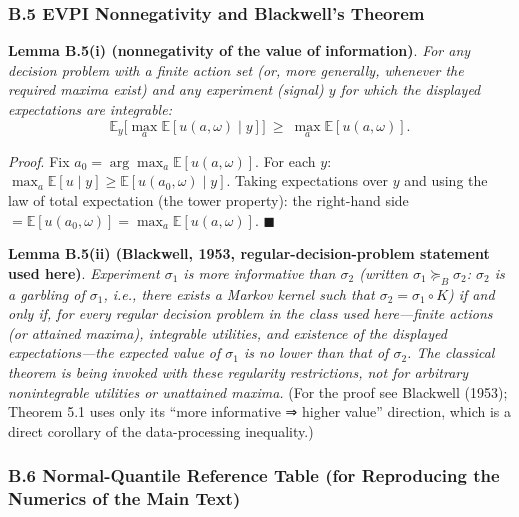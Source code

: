 \documentclass[
  11pt]{article}
\begin{document}
\subsubsection{B.5 EVPI Nonnegativity and Blackwell's
Theorem}\label{b.5-evpi-nonnegativity-and-blackwells-theorem}

\textbf{Lemma B.5(i) (nonnegativity of the value of information)}.
\emph{For any decision problem with a finite action set (or, more
generally, whenever the required maxima exist) and any experiment
(signal) \(y\) for which the displayed expectations are integrable:}
\[\mathbb{E}_y\Big[\max_a \mathbb{E}[u(a,\omega)\mid y]\Big] \ \ge\ \max_a \mathbb{E}[u(a,\omega)].\]

\emph{Proof}. Fix \(a_0 = \arg\max_a \mathbb{E}[u(a,\omega)]\). For each
\(y\):
\(\max_a \mathbb{E}[u\mid y] \ge \mathbb{E}[u(a_0,\omega)\mid y]\).
Taking expectations over \(y\) and using the law of total expectation
(the tower property): the right-hand side
\(= \mathbb{E}[u(a_0,\omega)] = \max_a \mathbb{E}[u(a,\omega)]\).
\(\blacksquare\)

\textbf{Lemma B.5(ii) (Blackwell, 1953, regular-decision-problem
statement used here)}. \emph{Experiment \(\sigma_1\) is more informative
than \(\sigma_2\) (written \(\sigma_1 \succeq_B \sigma_2\): \(\sigma_2\)
is a garbling of \(\sigma_1\), i.e., there exists a Markov kernel such
that \(\sigma_2 = \sigma_1 \circ K\)) if and only if, for every regular
decision problem in the class used here---finite actions (or attained
maxima), integrable utilities, and existence of the displayed
expectations---the expected value of \(\sigma_1\) is no lower than that
of \(\sigma_2\). The classical theorem is being invoked with these
regularity restrictions, not for arbitrary nonintegrable utilities or
unattained maxima.} (For the proof see Blackwell (1953); Theorem 5.1
uses only its ``more informative ⇒ higher value'' direction, which is a
direct corollary of the data-processing inequality.)

\subsubsection{B.6 Normal-Quantile Reference Table (for Reproducing the
Numerics of the Main
Text)}\label{b.6-normal-quantile-reference-table-for-reproducing-the-numerics-of-the-main-text}
\end{document}
